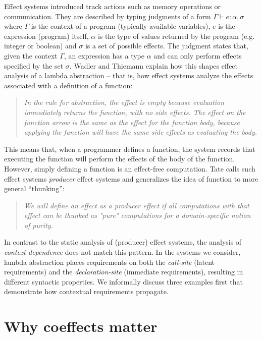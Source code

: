 Effect systems introduced track actions such as memory operations or communication. They are described 
by typing judgments of a form $\Gamma \vdash e : \alpha, \sigma$ where $\Gamma$ is the context of a 
program (typically available variables), $e$ is the expression (program) itself, $\alpha$ is the type of 
values returned by the program (e.g. integer or boolean) and $\sigma$ is a set of possible effects. The 
judgment states that, given the context $\Gamma$, an expression has a type $\alpha$ and can only perform 
effects specified by the set $\sigma$. Wadler and Thiemann \cite{monads-effects-marriage} explain how 
this shapes effect analysis of a lambda abstraction -- that is, how effect systems analyze the effects 
associated with a definition of a function:
%
\begin{quote} 
\emph{In the rule for abstraction, the effect is empty because evaluation immediately
returns the function, with no side effects. The effect on the function arrow
is the same as the effect for the function body, because applying the function will
have the same side effects as evaluating the body.}
\end{quote}
%
This means that, when a programmer defines a function, the system records that executing the 
function will perform the effects of the body of the function. However, simply defining a function
is an effect-free computation. Tate \cite{effects-producer-semantics} calls such effect systems
\emph{producer} effect systems and generalizes the idea of function to more general ``thunking'':
%
\begin{quote}
\emph{We will define an effect as a producer effect if all computations with that effect 
can be thunked as "pure" computations for a domain-specific notion of purity.}
\end{quote}
%
In contrast to the static analysis of (producer) effect systems, the analysis of 
\emph{context-dependence} does not match this pattern. In the systems we consider, lambda 
abstraction places requirements on both the \emph{call-site} (latent requirements) and the 
\emph{declaration-site} (immediate requirements), resulting in different syntactic properties. 
We informally discuss three examples first that demonstrate how contextual requirements propagate. 


\section{Why coeffects matter}

